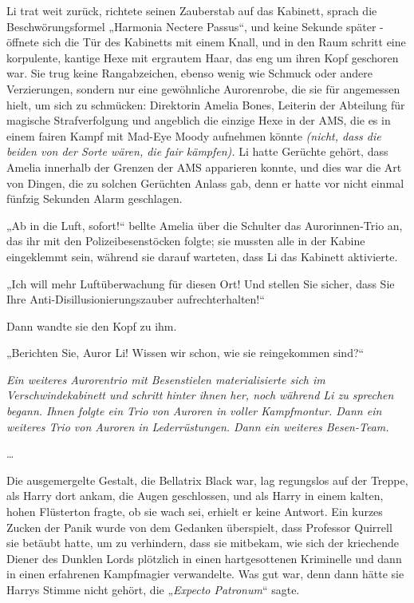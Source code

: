 {Li trat weit zurück, richtete seinen Zauberstab auf das Kabinett, sprach die Beschwörungsformel „Harmonia Nectere Passus“, und keine Sekunde später - öffnete sich die Tür des Kabinetts mit einem Knall, und in den Raum schritt eine korpulente, kantige Hexe mit ergrautem Haar, das eng um ihren Kopf geschoren war. Sie trug keine Rangabzeichen, ebenso wenig wie Schmuck oder andere Verzierungen, sondern nur eine gewöhnliche Aurorenrobe, die sie für angemessen hielt, um sich zu schmücken: Direktorin Amelia Bones, Leiterin der Abteilung für magische Strafverfolgung und angeblich die einzige Hexe in der AMS, die es in einem fairen Kampf mit Mad-Eye Moody aufnehmen könnte \emph{(nicht, dass die beiden von der Sorte wären, die fair kämpfen).} Li hatte Gerüchte gehört, dass Amelia innerhalb der Grenzen der AMS apparieren konnte, und dies war die Art von Dingen, die zu solchen Gerüchten Anlass gab, denn er hatte vor nicht einmal fünfzig Sekunden Alarm geschlagen.

„Ab in die Luft, sofort!“ bellte Amelia über die Schulter das Aurorinnen-Trio an, das ihr mit den Polizeibesenstöcken folgte; sie mussten alle in der Kabine eingeklemmt sein, während sie darauf warteten, dass Li das Kabinett aktivierte.

„Ich will mehr Luftüberwachung für diesen Ort! Und stellen Sie sicher, dass Sie Ihre Anti-Disillusionierungszauber aufrechterhalten!“

Dann wandte sie den Kopf zu ihm.

„Berichten Sie, Auror Li! Wissen wir schon, wie sie reingekommen sind?“

\emph{Ein weiteres Aurorentrio mit Besenstielen materialisierte sich im Verschwindekabinett und schritt hinter ihnen her, noch während Li zu sprechen begann. Ihnen folgte ein Trio von Auroren in voller Kampfmontur. Dann ein weiteres Trio von Auroren in Lederrüstungen. Dann ein weiteres Besen-Team.}

…

Die ausgemergelte Gestalt, die Bellatrix Black war, lag regungslos auf der Treppe, als Harry dort ankam, die Augen geschlossen, und als Harry in einem kalten, hohen Flüsterton fragte, ob sie wach sei, erhielt er keine Antwort. Ein kurzes Zucken der Panik wurde von dem Gedanken überspielt, dass Professor Quirrell sie betäubt hatte, um zu verhindern, dass sie mitbekam, wie sich der kriechende Diener des Dunklen Lords plötzlich in einen hartgesottenen Kriminelle und dann in einen erfahrenen Kampfmagier verwandelte. Was gut war, denn dann hätte sie Harrys Stimme nicht gehört, die „\emph{Expecto Patronum}“ sagte.

}
